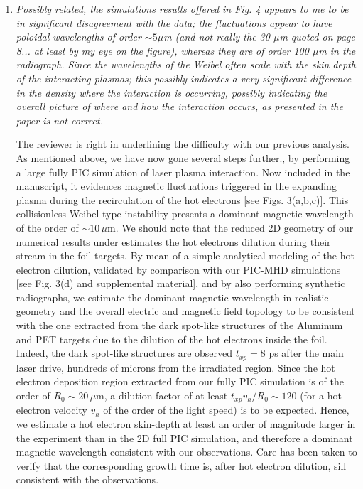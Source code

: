 \documentclass{article}
\begin{document}
\begin{enumerate}
\item \textit{Possibly related, the simulations results offered in Fig. 4 appears to me to be in significant disagreement with the data; the fluctuations appear to have poloidal wavelengths of order $\sim 5 \mu$m (and not really the 30 $\mu$m quoted on page 8... at least by my eye on the figure), whereas they are of order 100 $\mu$m in the radiograph. Since the wavelengths of the Weibel often scale with the skin depth of the interacting plasmas; this possibly indicates a very significant difference in the density where the interaction is occurring, possibly indicating the overall picture of where and how the interaction occurs, as presented in the paper is not correct. }

The reviewer is right in underlining the difficulty with our previous analysis. As mentioned above, we have now gone several steps further., by performing a  large fully PIC simulation of laser plasma interaction. Now included in the manuscript, it evidences magnetic fluctuations triggered in the expanding plasma during the recirculation of the hot electrons [see Figs. 3(a,b,c)]. This collisionless Weibel-type instability presents a dominant magnetic wavelength of the order of $\sim 10 \, \mu$m.
We should note that the reduced 2D geometry of our numerical results under estimates the hot electrons dilution during their stream in the foil targets. 
By mean of a simple analytical modeling of the hot electron dilution, validated by comparison with our PIC-MHD simulations [see Fig. 3(d) and supplemental material], and by also performing synthetic radiographs, we  estimate the  dominant magnetic wavelength in realistic geometry and the overall electric and magnetic field topology to be consistent with the one extracted from the dark spot-like structures of the Aluminum  and PET targets due to the dilution of the hot electrons inside the foil.
Indeed, the dark spot-like structures are observed $t_{xp}   = 8$ ps   after the main laser drive, hundreds of  microns from the irradiated region.
Since the hot electron deposition region extracted from our fully PIC simulation is of the order of $R_0\sim 20\, \mu$m, 
a dilution factor of at least $t_{xp} v_h / R_0 \sim 120$ (for a hot electron velocity $v_h$ of the order of  the light speed) is to be expected. Hence, we estimate a hot electron skin-depth at least  an order of magnitude larger in the experiment than in the 2D full PIC simulation,  and therefore a dominant magnetic wavelength consistent with our observations.
Care has been taken to verify that the corresponding growth time is, after hot electron dilution, sill consistent with the observations.


\end{enumerate}
\end{document}
